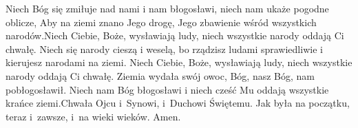 
\startpsalmusx[title={Psalm 67}] %
\startlines
Niech Bóg się zmiłuje nad nami i nam błogosławi,\pmed
niech nam ukaże pogodne oblicze,
Aby na ziemi znano Jego drogę,\pmed
Jego zbawienie wśród wszystkich narodów.\startnarrower[5mm]
Niech Ciebie, Boże, wysławiają ludy,\pmed
niech wszystkie narody oddają Ci chwałę.
Niech się narody cieszą i weselą,\pflx
bo rządzisz ludami sprawiedliwie\pmed
i kierujesz narodami na ziemi.\stopnarrower
Niech Ciebie, Boże, wysławiają ludy,\pmed
niech wszystkie narody oddają Ci chwałę.
Ziemia wydała swój owoc,\pmed
Bóg, nasz Bóg, nam pobłogosławił.
Niech nam Bóg błogosławi\pmed
i niech cześć Mu oddają wszystkie krańce ziemi.\startnarrower[5mm]
Chwała Ojcu i~Synowi,\pmed
i~Duchowi Świętemu.
Jak była na początku, teraz i~zawsze,\pmed
i~na wieki wieków. Amen.\stopnarrower\stoplines
\endinput


